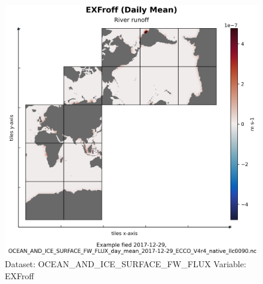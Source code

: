 \begin{figure}[H]
\centering
\includegraphics[width=\textwidth]{../images/plots/native_plots/Ocean_and_Sea-Ice_Surface_Freshwater_Fluxes/EXFroff.png}
\caption{Dataset: OCEAN\_AND\_ICE\_SURFACE\_FW\_FLUX Variable: EXFroff}
\label{tab:table-OCEAN_AND_ICE_SURFACE_FW_FLUX_EXFroff-Plot}
\end{figure}
\pagebreak

